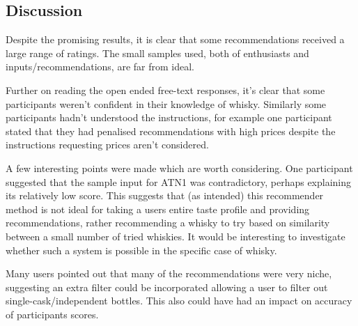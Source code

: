 \subsection{Discussion}\label{sec:disc}
Despite the promising results, it is clear that some 
recommendations received a large range of ratings.  The small samples used, both of enthusiasts and 
inputs/recommendations, are far from ideal.

Further on reading the open ended free-text responses, it's clear that some participants weren't confident
in their knowledge of whisky. Similarly some participants hadn't understood the instructions, for example
one participant stated that they had penalised recommendations with high prices despite the instructions
requesting prices aren't considered.

A few interesting points were made which are worth considering.  One participant suggested that the sample input
for ATN1 was contradictory, perhaps explaining its relatively low score. This suggests that (as intended) this 
recommender method is not ideal for taking a users entire taste profile and providing recommendations, 
rather recommending a whisky to try based on similarity between a small number of tried whiskies.  It would
be interesting to investigate whether such a system is possible in the specific case of whisky.

Many users pointed out that many of the recommendations were very niche, suggesting an extra filter could be
incorporated allowing a user to filter out single-cask/independent bottles.  This also could have had an 
impact on accuracy of participants scores.